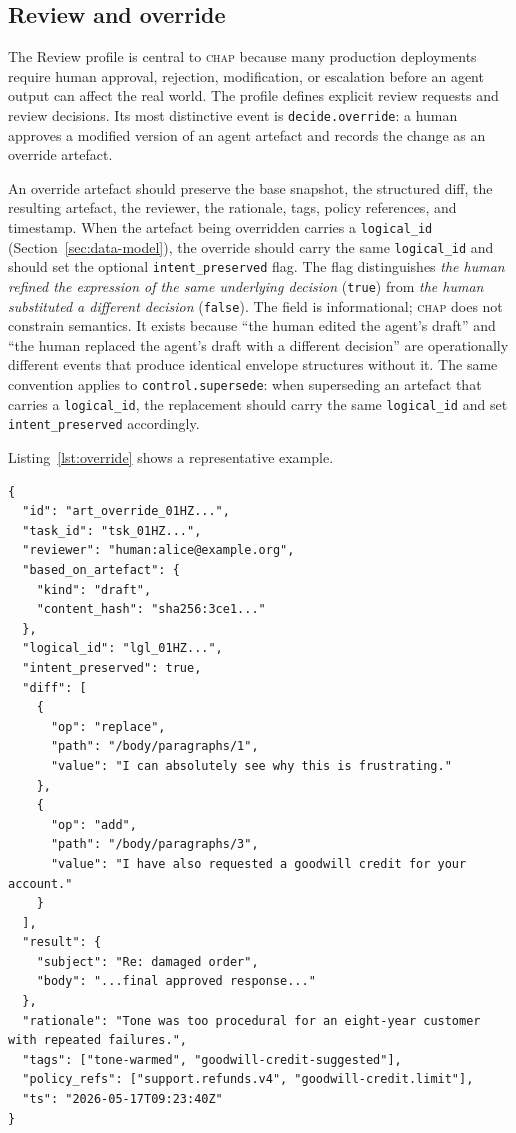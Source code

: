 \documentclass[11pt]{article}
\newcommand{\chap}{\textsc{chap}}
\begin{document}
\subsection{Review and override}

The Review profile is central to \chap{} because many production deployments require human approval, rejection, modification, or escalation before an agent output can affect the real world. The profile defines explicit review requests and review decisions. Its most distinctive event is \texttt{decide.override}: a human approves a modified version of an agent artefact and records the change as an override artefact.

An override artefact should preserve the base snapshot, the structured diff, the resulting artefact, the reviewer, the rationale, tags, policy references, and timestamp. When the artefact being overridden carries a \texttt{logical\_id} (Section~\ref{sec:data-model}), the override should carry the same \texttt{logical\_id} and should set the optional \texttt{intent\_preserved} flag. The flag distinguishes \emph{the human refined the expression of the same underlying decision} (\texttt{true}) from \emph{the human substituted a different decision} (\texttt{false}). The field is informational; \chap{} does not constrain semantics. It exists because ``the human edited the agent's draft'' and ``the human replaced the agent's draft with a different decision'' are operationally different events that produce identical envelope structures without it. The same convention applies to \texttt{control.supersede}: when superseding an artefact that carries a \texttt{logical\_id}, the replacement should carry the same \texttt{logical\_id} and set \texttt{intent\_preserved} accordingly.

Listing~\ref{lst:override} shows a representative example.

\begin{lstlisting}[caption={Representative override artefact.},label={lst:override}]
{
  "id": "art_override_01HZ...",
  "task_id": "tsk_01HZ...",
  "reviewer": "human:alice@example.org",
  "based_on_artefact": {
    "kind": "draft",
    "content_hash": "sha256:3ce1..."
  },
  "logical_id": "lgl_01HZ...",
  "intent_preserved": true,
  "diff": [
    {
      "op": "replace",
      "path": "/body/paragraphs/1",
      "value": "I can absolutely see why this is frustrating."
    },
    {
      "op": "add",
      "path": "/body/paragraphs/3",
      "value": "I have also requested a goodwill credit for your account."
    }
  ],
  "result": {
    "subject": "Re: damaged order",
    "body": "...final approved response..."
  },
  "rationale": "Tone was too procedural for an eight-year customer with repeated failures.",
  "tags": ["tone-warmed", "goodwill-credit-suggested"],
  "policy_refs": ["support.refunds.v4", "goodwill-credit.limit"],
  "ts": "2026-05-17T09:23:40Z"
}
\end{lstlisting}
\end{document}
